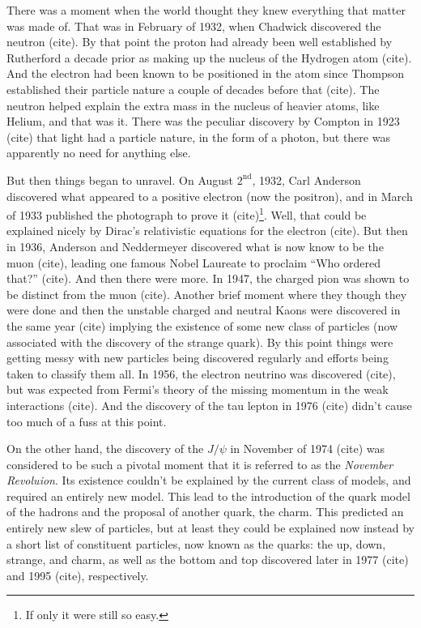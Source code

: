 There was a moment when the world thought they knew everything
that matter was made of. That was in February of 1932, when Chadwick discovered the
neutron (cite). By that point the proton had already been 
well established by Rutherford a decade prior as 
making up the nucleus of the Hydrogen
atom (cite). And the electron had been known to be positioned in the atom
since Thompson established their particle nature a couple of decades before
that (cite). The neutron helped explain the extra mass in the nucleus of heavier
atoms, like Helium, and that was it. There was the peculiar discovery 
by Compton in 1923 (cite) that light had a particle nature, in the form of a photon,
but there was apparently no need for anything else. 


But then things began to unravel. On August $2^{\textrm{nd}}$, 1932, Carl Anderson
discovered what appeared to a positive electron (now the positron), and in March of 1933 published 
the photograph to prove it (cite)\footnote{If only it were still so easy.}. 
Well, that could be explained nicely by Dirac's relativistic equations
for the electron (cite). But then in 1936, Anderson and Neddermeyer discovered
what is now know to be the muon (cite), leading one famous Nobel Laureate
to proclaim ``Who ordered that?'' (cite). And then there were more.
In 1947, the charged pion was shown to be distinct from the muon (cite).
Another brief moment where they though they were done and then the unstable
charged and neutral Kaons were discovered in the same year (cite) implying
the existence of some new class of particles (now associated with the discovery 
of the strange quark). By this point things were getting messy with new particles
being discovered regularly and efforts being taken to classify them all.
In 1956, the electron neutrino was discovered (cite), 
but was expected from Fermi's theory of the missing momentum 
in the weak interactions (cite).  And the discovery of the tau lepton
in 1976 (cite) didn't cause too much of a fuss at this point.


On the other hand, the discovery of the $J/\psi$ in November of
1974 (cite) was considered to be such a pivotal moment
that it is referred to as the \emph{November Revoluion}. 
Its existence couldn't be explained by the current class of models, and required an entirely
new model. This lead 
to the introduction of the 
quark model of the hadrons and the proposal of another quark, the charm.  
This predicted an entirely new slew of particles, but at least they could be explained
now instead by a short list of constituent particles, now known as the quarks: the up, down,
strange, and charm, as well as the bottom and top discovered later in 1977 (cite)
and 1995 (cite), respectively.




